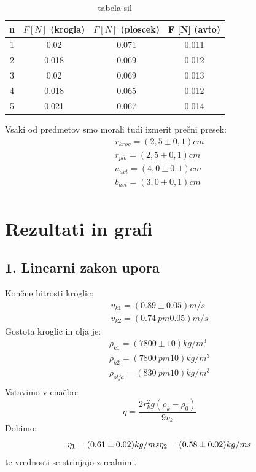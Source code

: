 \documentclass[11pt]{article}
\begin{document}
    \begin{table}[H]
        \centering
        \begin{tabular}{|c|c|c|c|}
            \hline
            n & $F [N]$ (krogla) & $F [N]$ (ploscek) & F [N] (avto)\\
            \hline
            1	& 0.02	& 0.071	 & 0.011 \\
            2	& 0.018	& 0.069	 & 0.012 \\
            3	& 0.02	& 0.069	 & 0.013 \\
            4	& 0.018	& 0.065	 & 0.012 \\
            5	& 0.021	& 0.067	 & 0.014 \\

            \hline
        \end{tabular}
        \caption{tabela sil}
        \label{tab:3}
    \end{table}
    Vsaki od predmetov smo morali tudi izmerit prečni presek:
    \begin{align*}
        r_{krog} = (2,5 \pm 0,1) cm \\
        r_{plo} = (2,5 \pm 0,1) cm \\
        a_{avt} = (4,0 \pm 0,1) cm \\
        b_{avt} = (3,0 \pm 0,1) cm \\
    \end{align*}

    \section{Rezultati in grafi}

    \subsection{1. Linearni zakon upora}
    Končne hitrosti kroglic:
    \begin{align*}
        v_{k1} = (0.89 \pm 0.05) m/s \\
        v_{k2} = (0.74 \ pm 0.05) m/s
    \end{align*}
    Gostota kroglic in olja je:
    \begin{align*}
        \rho_{k1} = (7800 \pm 10) kg/m^3 \\
        \rho_{k2} = (7800 \ pm 10) kg/m^3 \\
        \rho_{olja} = (830 \ pm 10) kg/m^3 \\
    \end{align*}
    Vstavimo v enačbo:
    \[
        \eta = \frac{2r_k^2 g(\rho_k - \rho_0)}{9v_k}
    \]
    Dobimo:
    \[
        \eta_1 = (0.61 \pm 0.02) kg/ms \\
        \eta_2 = (0.58 \pm 0.02) kg/ms
    \]
    te vrednosti se strinjajo z realnimi.
\end{document}
